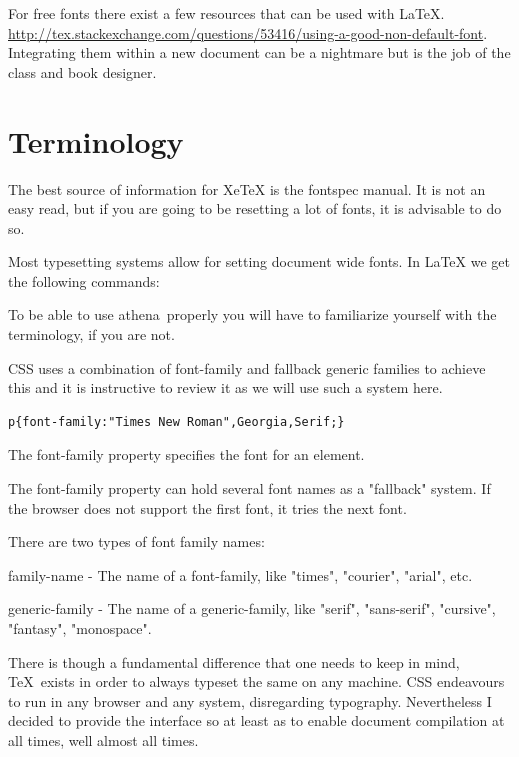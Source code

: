 \documentclass[10pt]{book}
\newcommand*{\verbatimfont}{\ttfamily}
\DeclareRobustCommand\cs[1]{{\color{themacro}\bfseries\verbatimfont\char`\\#1}%
  \index{macros!\textbackslash#1}}%
\let\cs\relax
\DeclareRobustCommand\cs[1]{{\color{themacro}\bfseries\verbatimfont\char`\\#1}%
  \index{macros!\textbackslash#1}}
\def\athena{\textcolor{thered}{athena}}
\begin{document}
{For free fonts there exist a few resources that can be used with \LaTeX. 
\url{http://tex.stackexchange.com/questions/53416/using-a-good-non-default-font}. Integrating them within a new document can be a nightmare but is the job of the class and book designer.

\section{Terminology}

The best source of information for XeTeX is the fontspec manual. It is not an easy read, but if you are going to be resetting a lot of fonts, it is advisable to do so.

Most typesetting systems allow for setting document wide fonts. In LaTeX we get the following commands:


\cs{sffamily}

\cs{rmfamily}

\cs{ttfamily}

To be able to use \athena\ properly you will have to familiarize yourself with the terminology, if you are not.

CSS uses a combination of font-family and fallback generic families to achieve this and it is instructive to review it as we will use such a system here.

\begin{tcolorbox}
\begin{lstlisting}
p{font-family:"Times New Roman",Georgia,Serif;}
\end{lstlisting}
\end{tcolorbox}

The font-family property specifies the font for an element.

The font-family property can hold several font names as a "fallback" system. If the browser does not support the first font, it tries the next font.

There are two types of font family names:

family-name - The name of a font-family, like "times", "courier", "arial", etc.

generic-family - The name of a generic-family, like "serif", "sans-serif", "cursive", "fantasy", "monospace".

There is though a fundamental difference that one needs to keep in mind, \TeX\ exists in order to always typeset the same on any machine. CSS endeavours to run in any browser and any system, disregarding typography. Nevertheless I decided to provide the interface so at least as to enable document compilation at all times, well almost all times.


}
\end{document}
